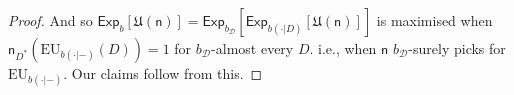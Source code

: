 \documentclass[a4paper]{article}
\newcommand\Exp{\mathsf{Exp}}
\newcommand\EU{\mathrm{EU}}
\newcommand\U{\mathfrak{U}} %
\newcommand{\D}{\mathcal{D}}
\newcommand{\Decs}{\mathcal{D}}
\newcommand{\n}{\mathsf{n}}
\renewcommand{\nu}{\n}
\newcommand\SetDelimiter[1][]{
	\nonscript\,#1\vert \allowbreak \nonscript\,\mathopen{}}
\providecommand\given{\SetDelimiter}
\newenvironment{CCM rewritten}
{\begingroup\color{blue}} %
{\endgroup}              %
\begin{document}
\begin{proof}
And so $\Exp_{b}[\U(\n)]=\Exp_{b_\Decs}[\Exp_{b(\cdot | D)}[\U(\n)]]$ is maximised when $\n_{D^*}(\EU_{b(\cdot|-)}(D))=1$ for $b_\Decs$-almost every $D$. 
i.e., when $\n$ $b_\Decs$-surely picks for $\EU_{b(\cdot|-)}$. 
Our claims follow from this.
%
%
%
%
%
%
%
%
%

\end{proof}
\end{document}

